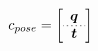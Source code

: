 \begin{equation}
  \label{eq:configuration_vector}
  \centering
  c_{pose}=\left[
    \begin{array}{c}
      \vb*{q} \\ \hdashline[1pt/2pt]
      \vb*{t}
    \end{array}
\right]
\end{equation}
